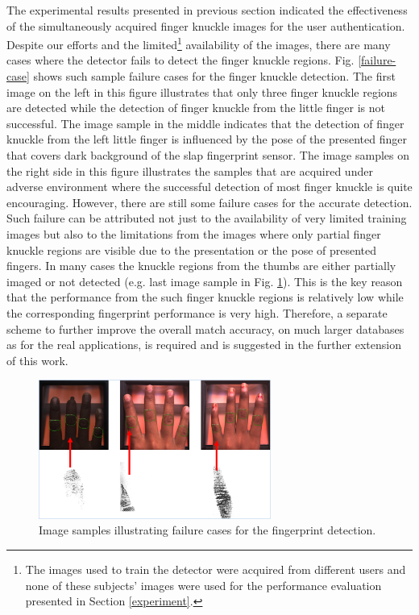 The experimental results presented in previous section indicated the effectiveness of the simultaneously acquired finger knuckle images for the user authentication. Despite our efforts and the limited\footnote[2]{The images used to train the detector were acquired from different users and none of these subjects’ images were used for the performance evaluation presented in Section \ref{experiment}.}  availability of the images, there are many cases where the detector fails to detect the finger knuckle regions. Fig. \ref{failure-case} shows such sample failure cases for the finger knuckle detection. The first image on the left in this figure illustrates that only three finger knuckle regions are detected while the detection of finger knuckle from the little finger is not successful. The image sample in the middle indicates that the detection of finger knuckle from the left little finger is influenced by the pose of the presented finger that covers dark background of the slap fingerprint sensor. The image samples on the right side in this figure illustrates the samples that are acquired under adverse environment where the successful detection of most finger knuckle is quite encouraging. However, there are still some failure cases for the accurate detection. Such failure can be attributed not just to the availability of very limited training images but also to the limitations from the images where only partial finger knuckle regions are visible due to the presentation or the pose of presented fingers.  In many cases the knuckle regions from the thumbs are either partially imaged or not detected (e.g. last image sample in Fig. \ref{failure-fingerprint}). This is the key reason that the performance from the such finger knuckle regions is relatively low while the corresponding fingerprint performance is very high. Therefore, a separate scheme to further improve the overall match accuracy, on much larger databases as for the real applications, is required and is suggested in the further extension of this work.  

\begin{figure}
    \begin{center}
        \includegraphics[width=3in]{Figures/failure-fingerprint.png}
    \end{center}
    \caption{Image samples illustrating failure cases for the fingerprint detection.}
    \label{failure-fingerprint}
\end{figure}

